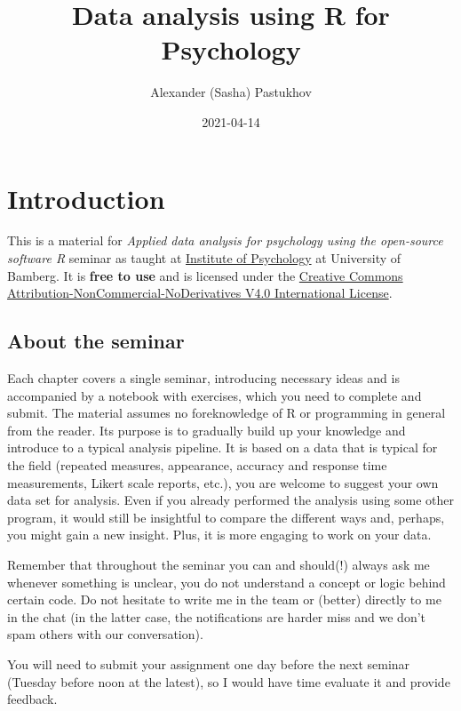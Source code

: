 \documentclass[
]{book}
\title{Data analysis using R for Psychology}
\author{Alexander (Sasha) Pastukhov}
\date{2021-04-14}
\begin{document}
\maketitle

{
\setcounter{tocdepth}{1}
\tableofcontents
}
\hypertarget{introduction}{%
\chapter*{Introduction}\label{introduction}}

This is a material for \emph{Applied data analysis for psychology using the open-source software R} seminar as taught at \href{https://www.uni-bamberg.de/psychologie/}{Institute of Psychology} at University of Bamberg. It is \textbf{free to use} and is licensed under the \href{https://creativecommons.org/licenses/by-nc-nd/4.0/}{Creative Commons Attribution-NonCommercial-NoDerivatives V4.0 International License}.

\hypertarget{about-the-seminar}{%
\section*{About the seminar}\label{about-the-seminar}}

Each chapter covers a single seminar, introducing necessary ideas and is accompanied by a notebook with exercises, which you need to complete and submit. The material assumes no foreknowledge of R or programming in general from the reader. Its purpose is to gradually build up your knowledge and introduce to a typical analysis pipeline. It is based on a data that is typical for the field (repeated measures, appearance, accuracy and response time measurements, Likert scale reports, etc.), you are welcome to suggest your own data set for analysis. Even if you already performed the analysis using some other program, it would still be insightful to compare the different ways and, perhaps, you might gain a new insight. Plus, it is more engaging to work on your data.

Remember that throughout the seminar you can and should(!) always ask me whenever something is unclear, you do not understand a concept or logic behind certain code. Do not hesitate to write me in the team or (better) directly to me in the chat (in the latter case, the notifications are harder miss and we don't spam others with our conversation).

You will need to submit your assignment one day before the next seminar (Tuesday before noon at the latest), so I would have time evaluate it and provide feedback.
\end{document}
